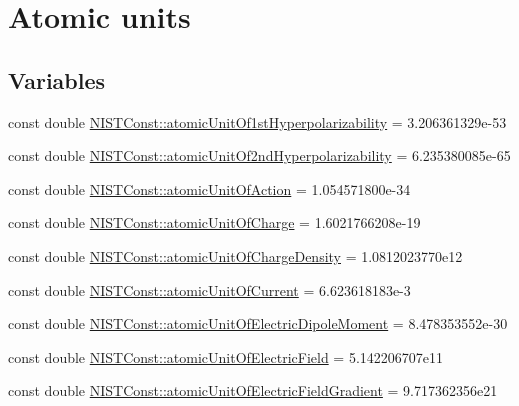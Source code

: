 \hypertarget{group___n_i_s_t_const-_atomic_unit}{}\section{Atomic units}
\label{group___n_i_s_t_const-_atomic_unit}
\subsection*{Variables}
\begin{DoxyCompactItemize}
\item 
const double \mbox{\hyperlink{group___n_i_s_t_const-_atomic_unit_gaa43ceaed22f3b69aee64d117cae645fb}{N\+I\+S\+T\+Const\+::atomic\+Unit\+Of1st\+Hyperpolarizability}} = 3.\+206361329e-\/53
\item 
const double \mbox{\hyperlink{group___n_i_s_t_const-_atomic_unit_ga55b22fa50aa069b98aa1bcb050206a8e}{N\+I\+S\+T\+Const\+::atomic\+Unit\+Of2nd\+Hyperpolarizability}} = 6.\+235380085e-\/65
\item 
const double \mbox{\hyperlink{group___n_i_s_t_const-_atomic_unit_ga6685e215d87395646fc18e2efa30d7a0}{N\+I\+S\+T\+Const\+::atomic\+Unit\+Of\+Action}} = 1.\+054571800e-\/34
\item 
const double \mbox{\hyperlink{group___n_i_s_t_const-_atomic_unit_ga1a42bd5db581dc5bf7a87b864bc77cf4}{N\+I\+S\+T\+Const\+::atomic\+Unit\+Of\+Charge}} = 1.\+6021766208e-\/19
\item 
const double \mbox{\hyperlink{group___n_i_s_t_const-_atomic_unit_gaa1918065ee8731837afe6bddee194320}{N\+I\+S\+T\+Const\+::atomic\+Unit\+Of\+Charge\+Density}} = 1.\+0812023770e12
\item 
const double \mbox{\hyperlink{group___n_i_s_t_const-_atomic_unit_ga6d0f3cfc8aaa2aeb120559aaea2dc5c6}{N\+I\+S\+T\+Const\+::atomic\+Unit\+Of\+Current}} = 6.\+623618183e-\/3
\item 
const double \mbox{\hyperlink{group___n_i_s_t_const-_atomic_unit_ga108a8be4e32eddd7cdfdf4473f3532ab}{N\+I\+S\+T\+Const\+::atomic\+Unit\+Of\+Electric\+Dipole\+Moment}} = 8.\+478353552e-\/30
\item 
const double \mbox{\hyperlink{group___n_i_s_t_const-_atomic_unit_gab8b246e91a41cadb97f128210a6c81db}{N\+I\+S\+T\+Const\+::atomic\+Unit\+Of\+Electric\+Field}} = 5.\+142206707e11
\item 
const double \mbox{\hyperlink{group___n_i_s_t_const-_atomic_unit_ga45f55b90a26e2e96f00c2664ddd79f11}{N\+I\+S\+T\+Const\+::atomic\+Unit\+Of\+Electric\+Field\+Gradient}} = 9.\+717362356e21

\end{DoxyCompactItemize}
